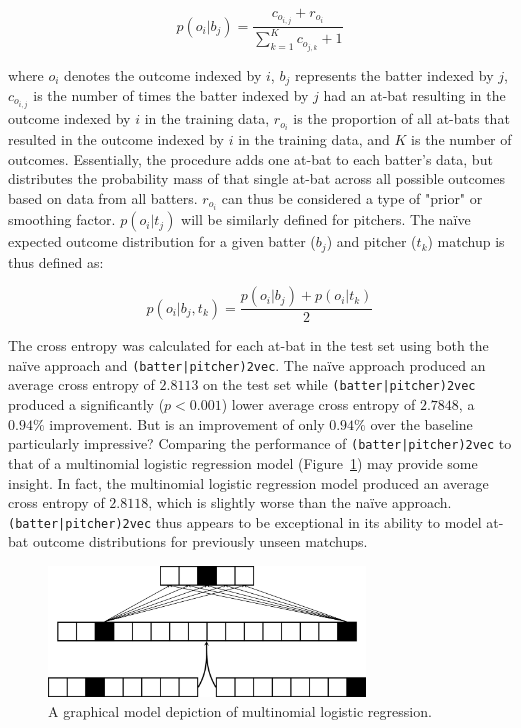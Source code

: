 \documentclass{article}
\begin{document}
\begin{equation}
\label{eqn:batter_naïve}
p(o_i|b_j)=\frac{c_{o_{i,j}} + r_{o_i}}{\sum_{k=1}^{K} c_{o_{j,k}} + 1}
\end{equation}

where $o_i$ denotes the outcome indexed by $i$, $b_j$ represents the batter indexed by $j$, $c_{o_{i,j}}$ is the number of times the batter indexed by $j$ had an at-bat resulting in the outcome indexed by $i$ in the training data, $r_{o_i}$ is the proportion of all at-bats that resulted in the outcome indexed by $i$ in the training data, and $K$ is the number of outcomes. Essentially, the procedure adds one at-bat to each batter's data, but distributes the probability mass of that single at-bat across all possible outcomes based on data from all batters. $r_{o_i}$ can thus be considered a type of "prior" or smoothing factor. $p(o_i|t_j)$ will be similarly defined for pitchers. The naïve expected outcome distribution for a given batter ($b_j$) and pitcher ($t_k$) matchup is thus defined as:

\begin{equation}
\label{eqn:naïve}
p(o_i|b_j,t_k) = \frac{p(o_i|b_j) + p(o_i|t_k)}{2}
\end{equation}

The cross entropy was calculated for each at-bat in the test set using both the naïve approach and \texttt{(batter|pitcher)2vec}. The naïve approach produced an average cross entropy of $2.8113$ on the test set while \texttt{(batter|pitcher)2vec} produced a significantly ($p < 0.001$) lower average cross entropy of $2.7848$, a $0.94\%$ improvement. But is an improvement of only $0.94\%$ over the baseline particularly impressive? Comparing the performance of \texttt{(batter|pitcher)2vec} to that of a multinomial logistic regression model (Figure~\ref{fig:log_reg}) may provide some insight. In fact, the multinomial logistic regression model produced an average cross entropy of $2.8118$, which is slightly worse than the naïve approach. \texttt{(batter|pitcher)2vec} thus appears to be exceptional in its ability to model at-bat outcome distributions for previously unseen matchups.

\begin{figure}
\centering
\includegraphics[width=0.75\textwidth,height=\textheight,keepaspectratio]{logistic_regression.png}
\caption{A graphical model depiction of multinomial logistic regression.}
\label{fig:log_reg}
\end{figure}
\end{document}
